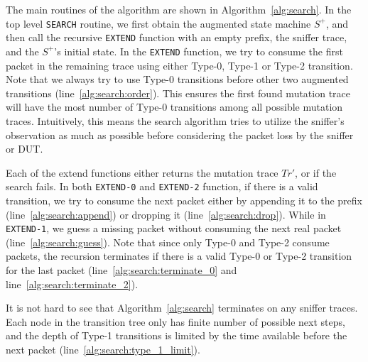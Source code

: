 The main routines of the algorithm are shown in Algorithm~\ref{alg:search}.  In
the top level \texttt{SEARCH} routine, we first obtain the augmented state
machine $S^+$, and then call the recursive \texttt{EXTEND} function with an empty
prefix, the sniffer trace, and the $S^+$'s initial state. 
In the \texttt{EXTEND} function, we try to consume the first packet in the
remaining trace using either Type-0, Type-1 or Type-2 transition.
Note that we always try to use Type-0 transitions before other two augmented
transitions (line~\ref{alg:search:order}).
This ensures the first found mutation trace will have the most number of Type-0
transitions among all possible mutation traces.
Intuitively, this means the search algorithm tries to utilize the sniffer's
observation as much as possible before considering the packet loss by the
sniffer or DUT.


Each of the extend functions either returns the mutation trace $Tr'$, or
\textit{\nil} if the search fails.
In both \texttt{EXTEND-0} and
\texttt{EXTEND-2} function, if there is a valid transition, we try to consume
the next packet either by appending it to the prefix
(line~\ref{alg:search:append}) or dropping it (line~\ref{alg:search:drop}).
While in \texttt{EXTEND-1}, we guess a missing packet without consuming the next
real packet (line~\ref{alg:search:guess}).
Note that since only Type-0 and Type-2 consume packets, the recursion terminates
if there is a valid Type-0 or Type-2 transition for the last packet
(line~\ref{alg:search:terminate_0} and line~\ref{alg:search:terminate_2}).



It is not hard to see that Algorithm~\ref{alg:search} terminates on any sniffer
traces. Each node in the transition tree only has finite number of possible next
steps, and the depth of Type-1 transitions is limited by the time available
before the next packet (line~\ref{alg:search:type_1_limit}).
